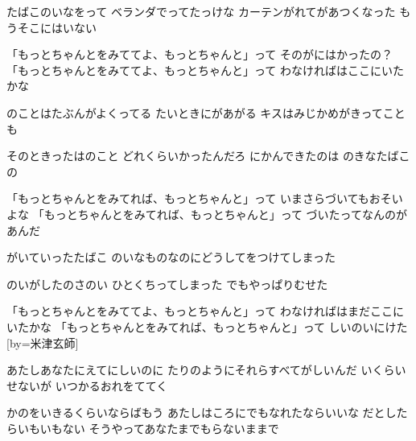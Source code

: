 \documentclass{article}
\newenvironment{Japanese}{%
\CJKfamily{min}%
\CJKtilde
\CJKnospace}{}
\begin{document}
\begin{CJK}{UTF8}{}
\begin{Japanese}
\begin{songs}{}
たばこのいなをって
ベランダでってたっけな
カーテンがれてがあつくなった
もうそこにはいない

「もっとちゃんとをみててよ、もっとちゃんと」って
そのがにはかったの？
「もっとちゃんとをみててよ、もっとちゃんと」って
わなければはここにいたかな

のことはたぶんがよくってる
たいときにがあがる
キスはみじかめがきってことも

そのときったはのこと
どれくらいかったんだろ
にかんできたのは
のきなたばこの

「もっとちゃんとをみてれば、もっとちゃんと」って
いまさらづいてもおそいよな
「もっとちゃんとをみてれば、もっとちゃんと」って
づいたってなんのがあんだ

がいていったたばこ
のいなものなのにどうしてをつけてしまった

のいがしたのさのい
ひとくちってしまった
でもやっぱりむせた

「もっとちゃんとをみててよ、もっとちゃんと」って
わなければはまだここにいたかな
「もっとちゃんとをみてれば、もっとちゃんと」って
しいのいにけた
\endverse
\endsong
[by=米津玄師]
\beginverse

あたしあなたにえてにしいのに
たりのようにそれらすべてがしいんだ
いくらいせないが
いつかるおれをててく

かのをいきるくらいならばもう
あたしはころにでもなれたならいいな
だとしたらいもいもない
そうやってあなたまでもらないままで


\end{songs}
\end{Japanese}
\end{CJK}
\end{document}
